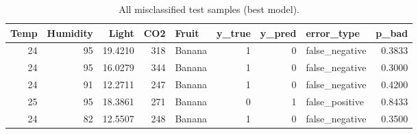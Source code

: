 \begin{table}
\caption{All misclassified test samples (best model).}
\label{tab:mis}
\begin{tabular}{rrrrlrrlr}
\toprule
Temp & Humidity & Light & CO2 & Fruit & y\_true & y\_pred & error\_type & p\_bad \\
\midrule
24 & 95 & 19.4210 & 318 & Banana & 1 & 0 & false\_negative & 0.3833 \\
24 & 95 & 16.0279 & 344 & Banana & 1 & 0 & false\_negative & 0.3000 \\
24 & 91 & 12.2711 & 247 & Banana & 1 & 0 & false\_negative & 0.4200 \\
25 & 95 & 18.3861 & 271 & Banana & 0 & 1 & false\_positive & 0.8433 \\
24 & 82 & 12.5507 & 248 & Banana & 1 & 0 & false\_negative & 0.3500 \\
\bottomrule
\end{tabular}
\end{table}

